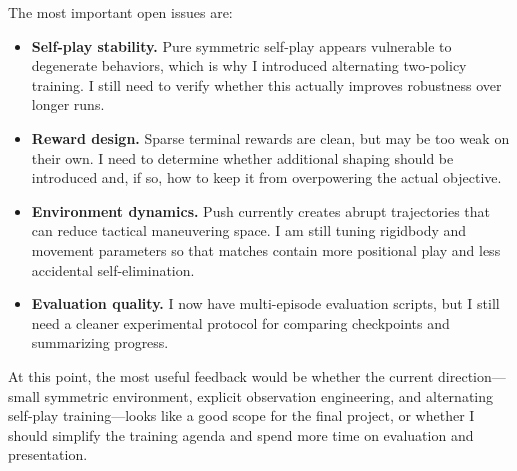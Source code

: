 \documentclass[10pt,twocolumn,letterpaper]{article}
\begin{document}
The most important open issues are:

\begin{itemize}
    \item \textbf{Self-play stability.} Pure symmetric self-play appears vulnerable to degenerate behaviors, which is why I introduced alternating two-policy training. I still need to verify whether this actually improves robustness over longer runs.
    \item \textbf{Reward design.} Sparse terminal rewards are clean, but may be too weak on their own. I need to determine whether additional shaping should be introduced and, if so, how to keep it from overpowering the actual objective.
    \item \textbf{Environment dynamics.} Push currently creates abrupt trajectories that can reduce tactical maneuvering space. I am still tuning rigidbody and movement parameters so that matches contain more positional play and less accidental self-elimination.
    \item \textbf{Evaluation quality.} I now have multi-episode evaluation scripts, but I still need a cleaner experimental protocol for comparing checkpoints and summarizing progress.
\end{itemize}

At this point, the most useful feedback would be whether the current direction---small symmetric environment, explicit observation engineering, and alternating self-play training---looks like a good scope for the final project, or whether I should simplify the training agenda and spend more time on evaluation and presentation.
\end{document}
